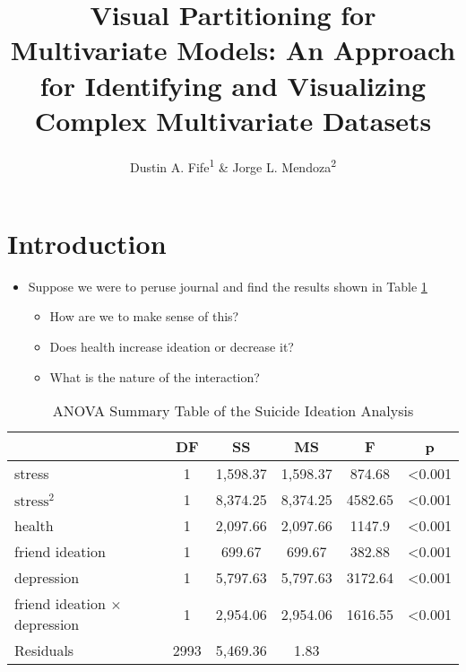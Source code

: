 \documentclass[
  english,
  doc,floatsintext]{apa6}
\title{Visual Partitioning for Multivariate Models: An Approach for Identifying and Visualizing Complex Multivariate Datasets}
\author{Dustin A. Fife\textsuperscript{1} \& Jorge L. Mendoza\textsuperscript{2}}
\date{}
\affiliation{\vspace{0.5cm}\textsuperscript{1} Rowan University\\\textsuperscript{2} University of Oklahoma}
\providecommand{\tightlist}{%
  \setlength{\itemsep}{0pt}\setlength{\parskip}{0pt}}
\begin{document}
\maketitle

\hypertarget{introduction}{%
\section{Introduction}\label{introduction}}

\begin{itemize}
\tightlist
\item
  Suppose we were to peruse journal and find the results shown in Table \ref{tab:anovatab}

  \begin{itemize}
  \tightlist
  \item
    How are we to make sense of this?
  \item
    Does health increase ideation or decrease it?
  \item
    What is the nature of the interaction?
  \end{itemize}
\end{itemize}

\begin{table}[tbp]

\begin{center}
\begin{threeparttable}

\caption{\label{tab:anovatab}ANOVA Summary Table of the Suicide Ideation Analysis}

\begin{tabular}{lccccc}
\toprule
 & DF & SS & MS & F & p\\
\midrule
stress & 1 & 1,598.37 & 1,598.37 & 874.68 & <0.001\\
$\text{stress}^2$ & 1 & 8,374.25 & 8,374.25 & 4582.65 & <0.001\\
health & 1 & 2,097.66 & 2,097.66 & 1147.9 & <0.001\\
friend ideation & 1 & 699.67 & 699.67 & 382.88 & <0.001\\
depression & 1 & 5,797.63 & 5,797.63 & 3172.64 & <0.001\\
friend ideation $ \times $ depression & 1 & 2,954.06 & 2,954.06 & 1616.55 & <0.001\\
Residuals & 2993 & 5,469.36 & 1.83 &  & \\
\bottomrule
\end{tabular}

\end{threeparttable}
\end{center}

\end{table}
\end{document}
